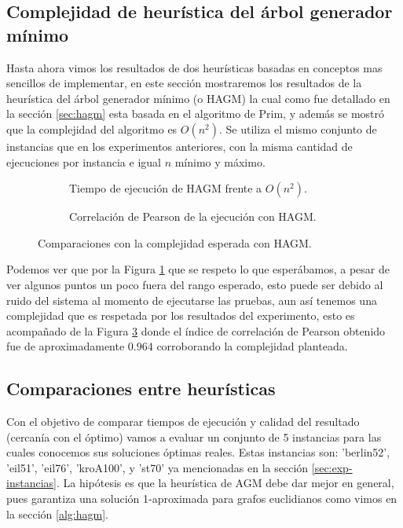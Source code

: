 \documentclass[10pt,a4paper]{article}
\begin{document}
\subsection{Complejidad de heurística del árbol generador mínimo}
Hasta ahora vimos los resultados de dos heurísticas basadas en conceptos mas sencillos de implementar, en este sección mostraremos los resultados de la heurística del árbol generador mínimo (o HAGM) la cual como fue detallado en la sección \ref{sec:hagm} esta basada en el algoritmo de Prim, y además se mostró que la complejidad del algoritmo es $O(n^2)$. Se utiliza el mismo conjunto de instancias que en los experimentos anteriores, con la misma cantidad de ejecuciones por instancia e igual $n$ mínimo y máximo.

\begin{figure}[h!]
    \centering
    \captionsetup{justification=centering}
    \begin{subfigure}{0.45\linewidth}
        \centering
        
        \caption{Tiempo de ejecución de HAGM frente a $O(n^2)$.}
        \label{fig:exp_hagm_1}
    \end{subfigure}
    \begin{subfigure}{0.45\linewidth}
        \centering
        
        \caption{Correlación de Pearson de la ejecución con HAGM.}
        \label{fig:exp_hagm_2}
    \end{subfigure}
    \caption{Comparaciones con la complejidad esperada con HAGM.}
\end{figure}

Podemos ver que por la Figura \ref{fig:exp_hagm_1} que se respeto lo que esperábamos, a pesar de ver algunos puntos un poco fuera del rango esperado, esto puede ser debido al ruido del sistema al momento de ejecutarse las pruebas, aun así tenemos una complejidad que es respetada por los resultados del experimento, esto es acompañado de la Figura \ref{fig:exp_hagm_2} donde el índice de correlación de Pearson obtenido fue de aproximadamente $0.964$ corroborando la complejidad planteada.


\subsection{Comparaciones entre heurísticas}
Con el objetivo de comparar tiempos de ejecución y calidad del resultado (cercanía con el óptimo) vamos a evaluar un conjunto de 5 instancias para las cuales conocemos sus soluciones óptimas reales. Estas instancias son: 'berlin52', 'eil51', 'eil76', 'kroA100', y 'st70' ya mencionadas en la sección \ref{sec:exp-instancias}. La hipótesis es que la heurística de AGM debe dar mejor en general, pues garantiza una solución 1-aproximada para grafos euclidianos como vimos en la sección \ref{alg:hagm}.
\end{document}

